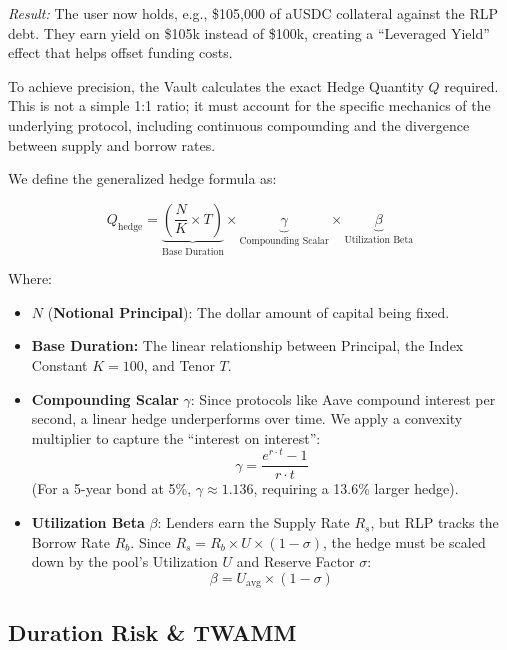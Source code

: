 \documentclass[12pt]{article}
\begin{document}
\emph{Result:} The user now holds, e.g., \$105,000 of aUSDC collateral against the RLP debt. They earn yield on \$105k instead of \$100k, creating a ``Leveraged Yield'' effect that helps offset funding costs.

To achieve precision, the Vault calculates the exact Hedge Quantity $Q$ required. This is not a simple 1:1 ratio; it must account for the specific mechanics of the underlying protocol, including continuous compounding and the divergence between supply and borrow rates.

We define the generalized hedge formula as:

\begin{equation}
    Q_{\text{hedge}} = \underbrace{\left( \frac{N}{K} \times T \right)}_{\text{Base Duration}} \times \underbrace{\gamma}_{\text{Compounding Scalar}} \times \underbrace{\beta}_{\text{Utilization Beta}}
\end{equation}

Where:

\begin{itemize}
    \item $N$ (\textbf{Notional Principal}): The dollar amount of capital being fixed.
    \item \textbf{Base Duration:} The linear relationship between Principal, the Index Constant $K=100$, and Tenor $T$.
    \item \textbf{Compounding Scalar} $\gamma$: Since protocols like Aave compound interest per second, a linear hedge underperforms over time. We apply a convexity multiplier to capture the ``interest on interest'':
    \begin{equation}
        \gamma = \frac{e^{r \cdot t} - 1}{r \cdot t}
    \end{equation}
    (For a 5-year bond at 5\%, $\gamma \approx 1.136$, requiring a 13.6\% larger hedge).
    \item \textbf{Utilization Beta} $\beta$: Lenders earn the Supply Rate $R_s$, but RLP tracks the Borrow Rate $R_b$. Since $R_s = R_b \times U \times (1 - \sigma)$, the hedge must be scaled down by the pool's Utilization $U$ and Reserve Factor $\sigma$:
    \begin{equation}
        \beta = U_{\text{avg}} \times (1 - \sigma)
    \end{equation}
\end{itemize}

\subsection{Duration Risk \& TWAMM}
\end{document}
